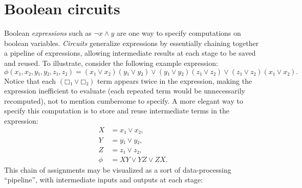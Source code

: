 


\section{Boolean circuits}

Boolean \emph{expressions} such as \(¬x∧y\) are one way to specify computations
on boolean variables.  \emph{Circuits} generalize expressions by essentially
chaining together a pipeline of expressions, allowing intermediate results at
each stage to be saved and reused.  To illustrate, consider the following
example expression:
\[
  ϕ(x₁,x₂,y₁,y₂,z₁,z₂)
  = (x₁∨x₂)(y₁∨y₂) ∨ (y₁∨y₂)(z₁∨z₂) ∨ (z₁∨z₂)(x₁∨x₂).
\]
Notice that each \((□₁∨□₂)\) term appears twice in the expression, making the
expression inefficient to evaluate (each repeated term would be unnecessarily
recomputed), not to mention cumbersome to specify.  A more elegant way to
specify this computation is to store and reuse intermediate terms in the
expression:
\begin{align*}
  X &= x₁∨x₂, \\
  Y &= y₁∨y₂, \\
  Z &= z₁∨z₂, \\
  ϕ &= XY∨YZ∨ZX.
\end{align*}
This chain of assignments may be visualized as a sort of data-processing
``pipeline'', with intermediate inputs and outputs at each stage:

